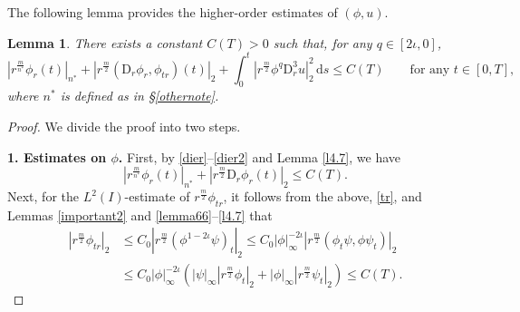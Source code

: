 \documentclass[11pt,reqno]{amsart}
\newtheorem{lem}{Lemma}[section]
\numberwithin{rk}{section}
\numberwithin{prop}{section}
\numberwithin{mydef}{section}
\numberwithin{lem}{section}
\numberwithin{equation}{section}
\numberwithin{thm}{section}
\begin{document}
The following lemma provides the higher-order estimates of $(\phi,u)$.
\begin{lem}\label{l4.9}  
There exists a constant $C(T)>0$ such that, for any $q\in [2\iota,0]$,
\begin{equation*}
|r^{\frac{m}{n^*}} \phi_{r}(t)|_{n^*}+|r^{\frac{m}{2}} (\mathrm{D}_r \phi_{r},\phi_{tr})(t)|_2+\int_{0}^{t} |r^{\frac{m}{2}}\phi^{q}\mathrm{D}_r^3 u|_2^2\,\mathrm{d}s\leq C(T)\qquad\text{for any $t\in [0,T]$},
\end{equation*}
where $n^*$ is defined as in {\rm\S\ref{othernote}}.
\end{lem}
\begin{proof} We divide the proof into two steps.

\smallskip
\textbf{1. Estimates on $\phi$.} First, by \eqref{dier}--\eqref{dier2} and Lemma \ref{l4.7}, we have
\begin{equation*}
|r^{\frac{m}{n^*}} \phi_{r}(t)|_{n^*}+|r^{\frac{m}{2}} \mathrm{D}_r \phi_{r} (t)|_2\leq C(T).
\end{equation*}
Next, for the $L^2(I)$-estimate of $r^\frac{m}{2}\phi_{tr}$, it follows from the above, \eqref{tr}, and Lemmas \ref{important2} and \ref{lemma66}--\ref{l4.7} that
\begin{equation*} 
\begin{aligned}
|r^{\frac{m}{2}}\phi_{tr}|_2&\leq C_0|r^\frac{m}{2}(\phi^{1-2\iota}\psi)_t|_2\leq C_0|\phi|_\infty^{-2\iota}|r^\frac{m}{2}(\phi_t\psi,\phi\psi_t)|_2 \\
&\leq C_0|\phi|_\infty^{-2\iota}(|\psi|_\infty |r^\frac{m}{2}\phi_t|_2+ |\phi|_\infty |r^\frac{m}{2}\psi_t|_2)\leq C(T).
\end{aligned}
\end{equation*}


\end{proof}
\end{document}
